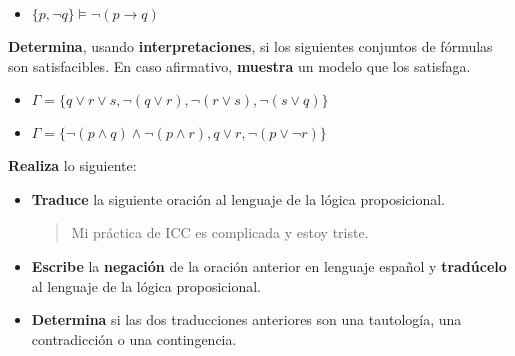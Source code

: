 \documentclass[oneside]{style}
\begin{document}
\begin{questions}[label=\protect\circled{\bfseries\arabic*}]
{\begin{itemize}
            \item $\{p, \neg q\} \models \neg (p \rightarrow q)$
        \end{itemize}
    }

    \question
    {
        \textbf{Determina}, usando \textbf{interpretaciones}, si los siguientes 
        conjuntos de fórmulas son satisfacibles. En caso afirmativo, 
        \textbf{muestra} un modelo que los satisfaga.
        \begin{itemize}
            \item $\Gamma = \{q \lor r \lor s, \neg (q \lor r), \neg (r \lor s), 
            \neg (s \lor q)\}$
            \item $\Gamma = \{\neg (p \land q) \land \neg (p \land r), q \lor r, 
            \neg (p \lor \neg r)\}$
        \end{itemize}
    }

    \question
    {
        \textbf{Realiza} lo siguiente:
        \begin{itemize}
            \item \textbf{Traduce} la siguiente oración al lenguaje de la 
            lógica proposicional. 

            \begin{quote}
                \centering
                Mi práctica de ICC es complicada y estoy triste. 
            \end{quote}

            \item \textbf{Escribe} la \textbf{negación} de la oración anterior 
            en lenguaje español y \textbf{tradúcelo} al lenguaje de la lógica 
            proposicional.

            \item \textbf{Determina} si las dos traducciones anteriores son 
            una tautología, una contradicción o una contingencia. 
        \end{itemize}
    }
\end{questions}
\end{document}
